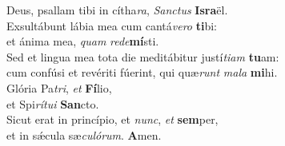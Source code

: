 \oddverse Deus, psallam tibi in cítha\textit{ra}, \textit{San}\textit{ctus} \textbf{Is}\textbf{ra}ël.\\
\evenverse Exsultábunt lábia mea cum cantá\textit{ve}\textit{ro} \textbf{ti}bi:~\*\\
\evenverse et ánima mea, \textit{quam} \textit{re}\textit{de}\textbf{mí}sti.\\
\oddverse Sed et lingua mea tota die meditábitur justí\textit{ti}\textit{am} \textbf{tu}am:~\*\\
\oddverse cum confúsi et revériti fúerint, qui quæ\textit{runt} \textit{ma}\textit{la} \textbf{mi}hi.\\
\evenverse Glória Pa\textit{tri}, \textit{et} \textbf{Fí}lio,~\*\\
\evenverse et Spi\textit{rí}\textit{tu}\textit{i} \textbf{San}cto.\\
\oddverse Sicut erat in princípio, et \textit{nunc}, \textit{et} \textbf{sem}per,~\*\\
\oddverse et in sǽcula sæ\textit{cu}\textit{ló}\textit{rum}. \textbf{A}men.\\

